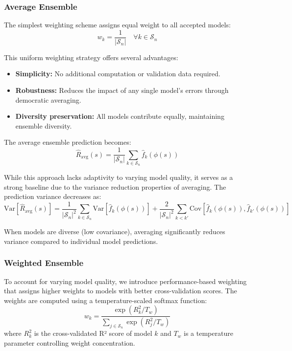 \documentclass[conference]{IEEEtran}
\begin{document}
\subsubsection{Average Ensemble}

The simplest weighting scheme assigns equal weight to all accepted models:
\begin{equation}
w_k = \frac{1}{|\mathcal{S}_n|} \quad \forall k \in \mathcal{S}_n
\end{equation}

This uniform weighting strategy offers several advantages:
\begin{itemize}
    \item \textbf{Simplicity:} No additional computation or validation data required.
    \item \textbf{Robustness:} Reduces the impact of any single model's errors through democratic averaging.
    \item \textbf{Diversity preservation:} All models contribute equally, maintaining ensemble diversity.
\end{itemize}

The average ensemble prediction becomes:
\begin{equation}
\hat{R}_{\text{avg}}(s) = \frac{1}{|\mathcal{S}_n|} \sum_{k \in \mathcal{S}_n} \hat{f}_k(\phi(s))
\end{equation}

While this approach lacks adaptivity to varying model quality, it serves as a strong baseline due to the variance reduction properties of averaging. The prediction variance decreases as:
\begin{equation}
\text{Var}[\hat{R}_{\text{avg}}(s)] = \frac{1}{|\mathcal{S}_n|^2} \sum_{k \in \mathcal{S}_n} \text{Var}[\hat{f}_k(\phi(s))] + \frac{2}{|\mathcal{S}_n|^2} \sum_{k < k'} \text{Cov}[\hat{f}_k(\phi(s)), \hat{f}_{k'}(\phi(s))]
\end{equation}

When models are diverse (low covariance), averaging significantly reduces variance compared to individual model predictions.

\subsubsection{Weighted Ensemble}

To account for varying model quality, we introduce performance-based weighting that assigns higher weights to models with better cross-validation scores. The weights are computed using a temperature-scaled softmax function:
\begin{equation}
w_k = \frac{\exp(R^2_k / T_w)}{\sum_{j \in \mathcal{S}_n} \exp(R^2_j / T_w)}
\end{equation}
where $R^2_k$ is the cross-validated R² score of model $k$ and $T_w$ is a temperature parameter controlling weight concentration.
\end{document}
